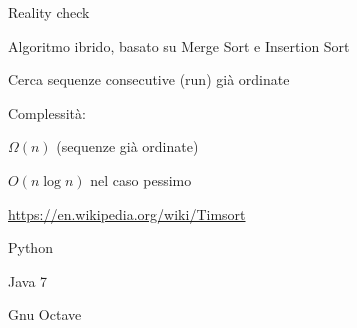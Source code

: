 \begin{frame}{Reality check}

\vspace{-9pt}
\begin{myboxtitle}
\BI
\item Algoritmo ibrido, basato su Merge Sort e Insertion Sort
\item Cerca sequenze consecutive (run) già ordinate 
\item Complessità: 
\BI
\item $\Omega(n)$ (sequenze già ordinate)
\item $O(n \log n)$ nel caso pessimo
\EI
\EI

\medskip
\url{https://en.wikipedia.org/wiki/Timsort}

\end{myboxtitle}

\begin{myboxtitle}[Utilizzazione]
\BI
\item Python
\item Java 7
\item Gnu Octave
\EI
\end{myboxtitle}

\end{frame}%



